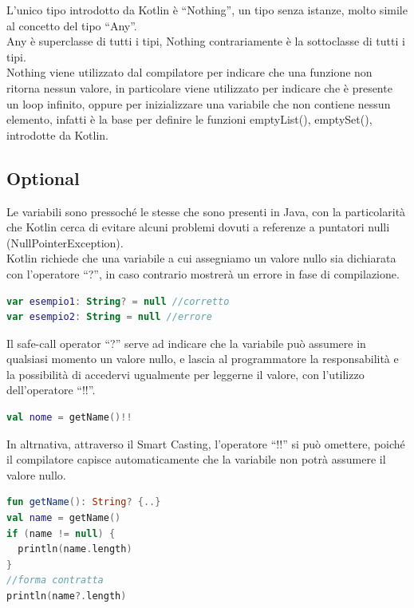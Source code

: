 \newpage
L'unico tipo introdotto da Kotlin è ``Nothing'', un tipo senza istanze, molto simile al concetto del tipo ``Any''.\\
Any è superclasse di tutti i tipi, Nothing contrariamente è la sottoclasse di tutti i tipi.\\
Nothing viene utilizzato dal compilatore per indicare che una funzione non ritorna nessun valore, in particolare viene utilizzato per indicare che è presente un loop infinito, oppure per inizializzare una variabile che non contiene nessun elemento, infatti è la base per definire le funzioni emptyList(), emptySet(), introdotte da Kotlin.


\subsection{Optional}
Le variabili sono pressoché le stesse che sono presenti in Java, con la particolarità che Kotlin cerca di evitare alcuni problemi dovuti a referenze a puntatori nulli (NullPointerException). \\
Kotlin richiede che una variabile a cui assegniamo un valore nullo sia dichiarata con l'operatore ``?'', in caso contrario mostrerà un errore in fase di compilazione.

\begin{lstlisting}[language=kotlin,caption={Esempio 1 Safe call operator Kotlin}]
var esempio1: String? = null //corretto
var esempio2: String = null //errore
\end{lstlisting}

Il safe-call operator ``?'' serve ad indicare che la variabile può assumere in qualsiasi momento un valore nullo, e lascia al programmatore la responsabilità e la possibilità di accedervi ugualmente per leggerne il valore, con l'utilizzo dell'operatore ``!!''.


\begin{lstlisting}[language=kotlin,caption={Esempio 2 Safe call operator Kotlin}]
val nome = getName()!!
\end{lstlisting}

\newpage


In altrnativa, attraverso il Smart Casting, l'operatore ``!!'' si può omettere, poiché il compilatore capisce automaticamente che la variabile non potrà assumere il valore nullo.

\begin{lstlisting}[language=kotlin,caption={Smart Casting in Kotlin}]
fun getName(): String? {..}
val name = getName()
if (name != null) {
  println(name.length)
}
//forma contratta
println(name?.length)
\end{lstlisting}

